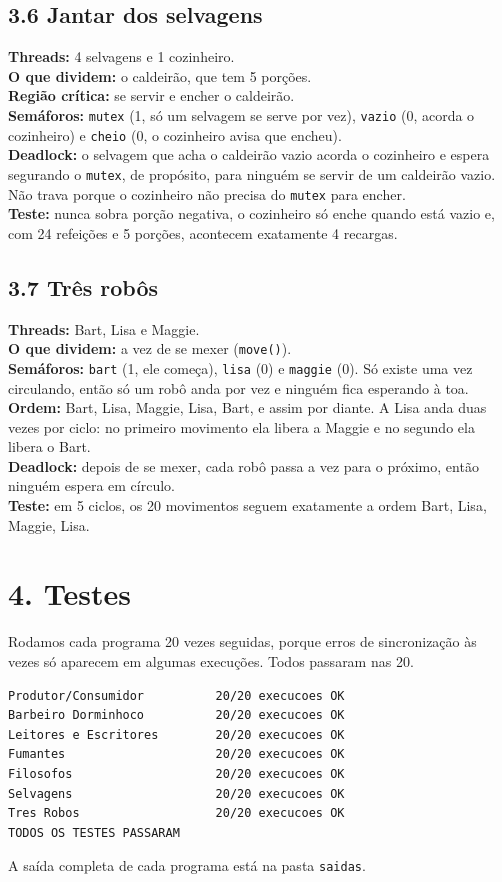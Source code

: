 \documentclass[12pt,a4paper]{article}
\begin{document}
\subsection*{3.6 Jantar dos selvagens}
\textbf{Threads:} 4 selvagens e 1 cozinheiro.\\
\textbf{O que dividem:} o caldeirão, que tem 5 porções.\\
\textbf{Região crítica:} se servir e encher o caldeirão.\\
\textbf{Semáforos:} \texttt{mutex} (1, só um selvagem se serve por vez), \texttt{vazio} (0, acorda o cozinheiro) e
\texttt{cheio} (0, o cozinheiro avisa que encheu).\\
\textbf{Deadlock:} o selvagem que acha o caldeirão vazio acorda o cozinheiro e espera segurando o \texttt{mutex},
de propósito, para ninguém se servir de um caldeirão vazio. Não trava porque o cozinheiro não precisa do
\texttt{mutex} para encher.\\
\textbf{Teste:} nunca sobra porção negativa, o cozinheiro só enche quando está vazio e, com 24 refeições e 5 porções,
acontecem exatamente 4 recargas.

\subsection*{3.7 Três robôs}
\textbf{Threads:} Bart, Lisa e Maggie.\\
\textbf{O que dividem:} a vez de se mexer (\texttt{move()}).\\
\textbf{Semáforos:} \texttt{bart} (1, ele começa), \texttt{lisa} (0) e \texttt{maggie} (0). Só existe uma vez
circulando, então só um robô anda por vez e ninguém fica esperando à toa.\\
\textbf{Ordem:} Bart, Lisa, Maggie, Lisa, Bart, e assim por diante. A Lisa anda duas vezes por ciclo: no primeiro
movimento ela libera a Maggie e no segundo ela libera o Bart.\\
\textbf{Deadlock:} depois de se mexer, cada robô passa a vez para o próximo, então ninguém espera em círculo.\\
\textbf{Teste:} em 5 ciclos, os 20 movimentos seguem exatamente a ordem Bart, Lisa, Maggie, Lisa.

\section*{4. Testes}
Rodamos cada programa 20 vezes seguidas, porque erros de sincronização às vezes só aparecem em algumas execuções.
Todos passaram nas 20.
\begin{small}
\begin{Verbatim}[frame=single]
Produtor/Consumidor          20/20 execucoes OK
Barbeiro Dorminhoco          20/20 execucoes OK
Leitores e Escritores        20/20 execucoes OK
Fumantes                     20/20 execucoes OK
Filosofos                    20/20 execucoes OK
Selvagens                    20/20 execucoes OK
Tres Robos                   20/20 execucoes OK
TODOS OS TESTES PASSARAM
\end{Verbatim}
\end{small}
A saída completa de cada programa está na pasta \texttt{saidas}.
\end{document}
